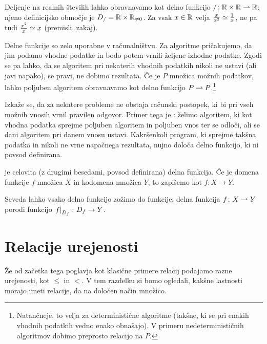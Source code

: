 		\begin{zgled}
			Deljenje na realnih številih lahko obravnavamo kot delno funkcijo $/\colon \mathbb{R} \times \mathbb{R} \mathrel{\rightharpoonup} \mathbb{R}$; njeno definicijsko območje je $D_{/} = \mathbb{R} \times \mathbb{R}_{\neq 0}$. Za vsak $x \in \mathbb{R}$ velja $\frac{x}{x^2} \simeq \frac{1}{x}$, ne pa tudi $\frac{x^2}{x} \simeq x$ (premisli, zakaj).
		\end{zgled}
		
		\begin{zgled}
			Delne funkcije so zelo uporabne v računalništvu. Za algoritme pričakujemo, da jim podamo vhodne podatke in bodo potem vrnili željene izhodne podatke. Zgodi se pa lahko, da se algoritem pri nekaterih vhodnih podatkih nikoli ne ustavi (ali javi napako), se pravi, ne dobimo rezultata. Če je $P$ množica možnih podatkov, lahko poljuben algoritem obravnavamo kot delno funkcijo $P \mathrel{\rightharpoonup} P$.\footnote{Natančneje, to velja za deterministične algoritme (takšne, ki se pri enakih vhodnih podatkih vedno enako obnašajo). V primeru nedeterminističnih algoritmov dobimo preprosto relacijo na $P$.}
			
			Izkaže se, da za nekatere probleme ne obstaja računski postopek, ki bi pri vseh možnih vnosih vrnil pravilen odgovor. Primer tega je : želimo algoritem, ki kot vhodna podatka sprejme poljuben algoritem in poljuben vnos ter se odloči, ali se dani algoritem pri danem vnosu ustavi. Kakršenkoli program, ki sprejme takšna podatka in nikoli ne vrne napačnega rezultata, nujno določa delno funkcijo, ki ni povsod definirana. 
		\end{zgled}
		
		\begin{definicija}
			 je celovita (z drugimi besedami, povsod definirana) delna funkcija. Če je domena funkcije $f$ množica $X$ in kodomena množica $Y$, to zapišemo kot $f\colon X \to Y$.
		\end{definicija}
		
		Seveda lahko vsako delno funkcijo zožimo do funkcije: delna funkcija $f\colon X \mathrel{\rightharpoonup} Y$ porodi funkcijo $\left.{f}\right|_{D_{f}}\colon D_{f} \to Y$.
	
	
	\section{Relacije urejenosti}\label{RAZDELEK: Relacije urejenosti}
	
		Že od začetka tega poglavja kot klasične primere relacij podajamo razne urejenosti, kot $\leq$ in $<$. V tem razdelku si bomo ogledali, kakšne lastnosti morajo imeti relacije, da na določen način  množico.
		
